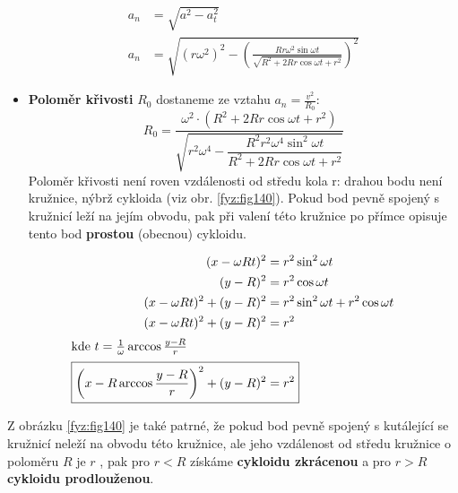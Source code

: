 \begin{example}
\begin{itemize}
      \begin{align*}
        a_n &= \sqrt{a^2 - a_t^2}                                                 \\
        a_n &= \sqrt{(r\omega^2)^2-\left(
               \frac{Rr\omega^2\sin\omega t}
                    {\sqrt{R^2 + 2Rr\cos\omega t + r^2}}\right)^2}
      \end{align*}
    \item \textbf{Poloměr křivosti} $R_0$ dostaneme ze vztahu $a_n=\frac{v^2}{R_0}$:
      \begin{equation*}
          R_0 =  \dfrac{\omega^2\cdot(R^2 + 2Rr\cos\omega t + r^2)}{\sqrt{r^2\omega^4 - 
                   \dfrac{R^2r^2\omega^4\sin^2\omega t}{R^2 + 2Rr\cos\omega t + r^2}}}
      \end{equation*}
      Poloměr křivosti není roven vzdálenosti od středu kola r: drahou bodu není kružnice, nýbrž 
      cykloida (viz obr. \ref{fyz:fig140}). Pokud bod pevně spojený s kružnicí leží na 
      jejím obvodu, pak při valení této kružnice po přímce opisuje tento bod \textbf{prostou} 
      (obecnou) cykloidu. 
  \end{itemize}
  
  \begin{align*}
    (x - \omega R t)^2            &= r^2\sin^2\omega t                          \\
    (y-R)^2                       &= r^2\cos\omega t                            \\
    (x - \omega R t)^2 + (y-R)^2  &= r^2\sin^2\omega t + r^2\cos\omega t        \\
    (x - \omega R t)^2 + (y-R)^2  &= r^2 \quad                                  \\
    \shortintertext{kde \(t = \frac{1}{\omega}\arccos\frac{y-R}{r}\)}
    \Aboxed{\left(x - R\arccos\frac{y-R}{r}\right)^2 + (y-R)^2  &= r^2}
  \end{align*}

   {\centering
    \captionsetup{type=figure}
    
    \label{fyz:fig140}
    \par}       
    \vspace{1em}
   
   Z obrázku \ref{fyz:fig140} je také patrné, že pokud bod pevně spojený s kutálející se kružnicí 
   neleží na obvodu této kružnice, ale jeho vzdálenost od středu kružnice o poloměru \(R\)  je 
   \(r\) , pak pro \(r<R\) získáme \textbf{cykloidu zkrácenou} a pro \(r>R\)  \textbf{cykloidu 
   prodlouženou}.
      

\end{example}
